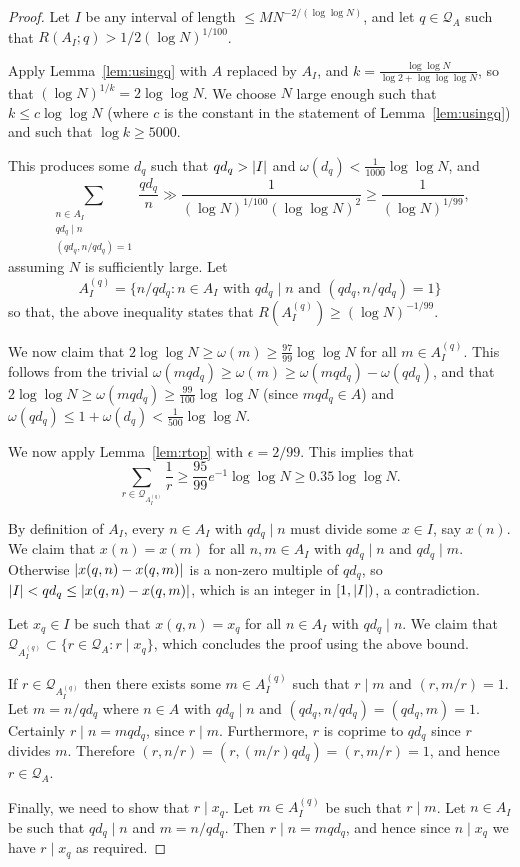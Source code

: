 \begin{proof}
Let $I$ be any interval of length $\leq MN^{-2/(\log\log N)}$, and let $q\in\mathcal{Q}_A$ such that $R(A_I;q)> 1/2(\log N)^{1/100}$.

Apply Lemma~\ref{lem:usingq} with $A$ replaced by $A_I$, and $k=\frac{\log\log N}{\log 2+\log\log\log N}$, so that $(\log N)^{1/k}=2\log\log N$. We choose $N$ large enough such that $k\leq c\log\log N$ (where $c$ is the constant in the statement of Lemma~\ref{lem:usingq}) and such that $\log k\geq 5000$.

This produces some $d_q$ such that $qd_q>\left\lvert I\right\rvert$ and $\omega(d_q)<\tfrac{1}{1000}\log\log N$, and
  \[\sum_{\substack{n\in A_I\\ qd_q\mid n\\ (qd_q,n/qd_q)=1}}\frac{qd_q}{n}\gg \frac{1}{(\log N)^{1/100}(\log\log N)^2}\geq \frac{1}{(\log N)^{1/99}},\]
assuming $N$ is sufficiently large. Let
  \[A_I^{(q)}=\{ n/qd_q : n\in A_I\textrm{ with }qd_q\mid n\textrm{ and }(qd_q,n/qd_q)=1\}\]
  so that, the above inequality states that $R(A_I^{(q)})\geq (\log N)^{-1/99}$.

We now claim that $2\log\log N\geq \omega(m) \geq \tfrac{97}{99}\log\log N$ for all $m\in A_I^{(q)}$. This follows from the trivial $\omega(mqd_q)\geq \omega(m)\geq \omega(mqd_q)-\omega(qd_q)$, and that $2\log\log N\geq \omega(mqd_q)\geq  \frac{99}{100}\log\log N$ (since $mqd_q\in A$) and $\omega(qd_q)\leq 1+\omega(d_q)<\frac{1}{500}\log\log N$.

We now apply Lemma~\ref{lem:rtop} with $\epsilon=2/99$. This implies that
  \[\sum_{r\in \mathcal{Q}_{A_I^{(q)}}}\frac{1}{r}\geq \frac{95}{99}e^{-1}\log\log N\geq 0.35\log\log N.\]


    By definition of $A_I$, every $n\in A_I$ with $qd_q\mid n$ must divide some $x\in I$, say $x(n)$. We claim that $x(n)=x(m)$ for all $n,m\in A_I$ with $qd_q\mid n$ and $qd_q\mid m$. Otherwise $\left\lvert x(q,n)-x(q,m)\right\rvert$ is a non-zero multiple of $qd_q$, so $\left\lvert I\right\rvert<qd_q\leq \left\lvert x(q,n)-x(q,m)\right\rvert$, which is an integer in $[1,\left\lvert I\right\rvert)$, a contradiction.

  Let $x_q\in I$ be such that $x(q,n)=x_q$ for all $n\in A_I$ with $qd_q \mid n$. We claim that $\mathcal{Q}_{A_I^{(q)}}\subset \{ r\in \mathcal{Q}_A : r\mid x_q\}$, which concludes the proof using the above bound.

If $r\in \mathcal{Q}_{A_I^{(q)}}$ then there exists some $m\in A_I^{(q)}$ such that $r\mid m$ and $(r,m/r)=1$. Let $m=n/qd_q$ where $n\in A$ with $qd_q\mid n$ and $(qd_q,n/qd_q)=(qd_q,m)=1$. Certainly $r\mid n = mqd_q$, since $r\mid m$. Furthermore, $r$ is coprime to $qd_q$ since $r$ divides $m$. Therefore $(r,n/r)=(r,(m/r)qd_q)=(r,m/r)=1$, and hence $r\in \mathcal{Q}_A$.

Finally, we need to show that $r\mid x_q$. Let $m\in A_I^{(q)}$ be such that $r\mid m$. Let $n\in A_I$ be such that $qd_q\mid n$ and $m=n/qd_q$. Then $r\mid n=mqd_q$, and hence since $n\mid x_q$ we have $r\mid x_q$ as required.
\end{proof}

